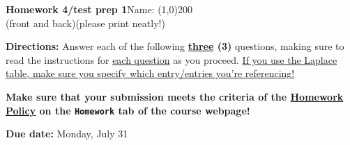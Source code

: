 \documentclass[12pt]{article}
\begin{document}
	\begin{flushright}
		{\large \textbf{Homework 4}}{\textbf{\scriptsize{/test prep 1}}}\hfill Name: \line(1,0){200}\\
		{\mbox{\hspace{1.75mm}}\small(front and back)}\hfill{\small (please print neatly!)}\mbox{\hspace{0.7in}}
	\end{flushright}
	\vspace{-1.5mm}
	\begin{adjustwidth}{0.5in}{0.5in}
		\begin{tcolorbox}[
			arc=0pt, colback=white, colframe=black, boxrule=0.5pt, before upper={\parindent15pt \parskip=3mm}]
			
			{\noindent\textbf{Directions:} Answer each of the following \textbf{\ul{three} (3)} questions, making sure to read the instructions for \ul{each question} as you proceed. \ul{If you use the Laplace table, make sure you specify which entry/entries you're referencing!}\par
			
			\textbf{Make sure that your submission meets the criteria of the \ul{Homework Policy} on the \texttt{Homework} tab of the course webpage!}\par
			
		
			\hfill\textbf{Due date:} Monday, July 31}
		\end{tcolorbox}
	\end{adjustwidth}
		
\end{document}
